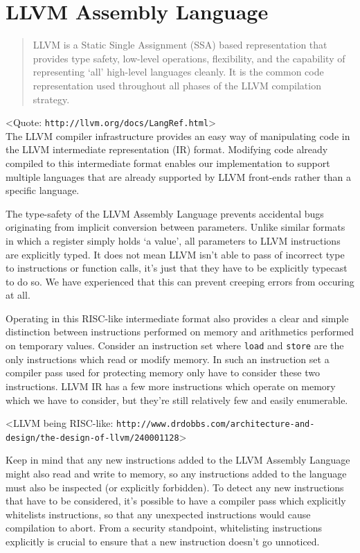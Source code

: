 \chapter {LLVM Assembly Language}

\begin{quote}
LLVM is a Static Single Assignment (SSA) based representation that provides
type safety, low-level operations, flexibility, and the capability of
representing `all' high-level languages cleanly. It is the common code
representation used throughout all phases of the LLVM compilation strategy.
\end{quote}

<Quote: \texttt{http://llvm.org/docs/LangRef.html}>\\

\noindent The LLVM compiler infrastructure provides an easy way of manipulating
code in the LLVM intermediate representation (IR) format. Modifying code
already compiled to this intermediate format enables our implementation to
support multiple languages that are already supported by LLVM front-ends rather
than a specific language.

The type-safety of the LLVM Assembly Language prevents accidental bugs
originating from implicit conversion between parameters. Unlike similar formats
in which a register simply holds `a value', all parameters to LLVM instructions
are explicitly typed. It does not mean LLVM isn't able to pass of incorrect type
to instructions or function calls, it's just that they have to be explicitly
typecast to do so. We have experienced that this can prevent creeping errors
from occuring at all.

Operating in this RISC-like intermediate format also provides a clear and
simple distinction between instructions performed on memory and arithmetics
performed on temporary values. Consider an instruction set where \texttt{load}
and \texttt{store} are the only instructions which read or modify memory. In
such an instruction set a compiler pass used for protecting memory only have to
consider these two instructions. LLVM IR has a few more instructions which
operate on memory which we have to consider, but they're still relatively few
and easily enumerable.

<LLVM being RISC-like: \texttt{http://www.drdobbs.com/architecture-and-design/the-design-of-llvm/240001128}>

Keep in mind that any new instructions added to the LLVM Assembly Language might
also read and write to memory, so any instructions added to the language must
also be inspected (or explicitly forbidden). To detect any new instructions that
have to be considered, it's possible to have a compiler pass which explicitly
whitelists instructions, so that any unexpected instructions would cause
compilation to abort. From a security standpoint, whitelisting instructions
explicitly is crucial to ensure that a new instruction doesn't go unnoticed.

